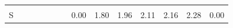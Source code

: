 \begin{frame}
\begin{columns}
\begin{overlayarea}{\textwidth}{\textheight}
\begin{minipage}[t]{0.25\textwidth}
{\begin{table}[h]
{\begin{tabular}{p{0.1cm}p{0.1cm}p{0.1cm}p{0.1cm}p{0.1cm}p{0.1cm}p{0.1cm}p{0.1cm}p{0.1cm}p{0.1cm}p{0.1cm}p{0.1cm}p{0.1cm}p{0.1cm}}
								\multicolumn{1}{l}{} &                       & \multicolumn{1}{l}{}      & \multicolumn{1}{l}{}      & \multicolumn{1}{l}{}      & \multicolumn{1}{l}{}      & \multicolumn{1}{l}{}      & \multicolumn{1}{l}{}                             & \multicolumn{1}{l}{}                             & \multicolumn{1}{l}{}                             & \multicolumn{1}{l}{}                             & \multicolumn{1}{l}{}                             & \multicolumn{1}{l}{}                             &                                                  \\  \cline{9-14} 
								S                    &                       &                           &                           &                           &                           &                           & \multicolumn{1}{c|}{{\color[HTML]{FFFFFF} 0.00}} & \multicolumn{1}{c|}{{\color[HTML]{333333} 1.80}} & \multicolumn{1}{c|}{{\color[HTML]{333333} 1.96}} & \multicolumn{1}{c|}{{\color[HTML]{333333} 2.11}} & \multicolumn{1}{c|}{{\color[HTML]{333333} 2.16}} & \multicolumn{1}{c|}{{\color[HTML]{333333} 2.28}} & \multicolumn{1}{c|}{{\color[HTML]{FFFFFF} 0.00}} \\ \cline{9-14} 
								
							\end{tabular}
						}
					\end{table}
				}
				

\end{minipage}
\end{overlayarea}
\end{columns}
\end{frame}
